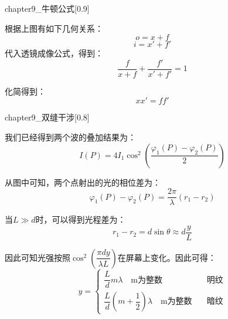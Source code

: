 \begin{prove}
  \begin{singlefigure}[牛顿公式示意图]{chapter9_牛顿公式}[0.9]
  \end{singlefigure}

  根据上图有如下几何关系：
  \[o = x + f\]
  \[i = x' + f'\]
  代入透镜成像公式，得到：
  \[\dfrac{f}{x+f} + \dfrac{f'}{x' + f'} = 1\]

  化简得到：
  \[xx' = ff'\]
\end{prove}

\begin{prove}
  \begin{singlefigure}[双缝干涉]{chapter9_双缝干涉}[0.8]
  \end{singlefigure}
  我们已经得到两个波的叠加结果为：
  \[I(P) = 4I_1\cos^2(\dfrac{\varphi_1(P) - \varphi_2(P)}{2})\]

  从图中可知，两个点射出的光的相位差为：
  \[\varphi_1(P) - \varphi_2(P) = \dfrac{2\pi}{\lambda}(r_1 - r_2)\]

  当$L \gg d$时，可以得到光程差为：
  \[r_1 - r_2 = d\sin\theta \approx d\dfrac{y}{L}\]

  因此可知光强按照$\cos^2(\dfrac{\pi d y}{\lambda L})$在屏幕上变化。因此可得：
  \[y = \begin{cases}
        \dfrac{L}{d}m\lambda \quad \text{m为整数} & \text{明纹}\\[1em]
        \dfrac{L}{d}(m+\dfrac{1}{2})\lambda \quad \text{m为整数} \quad & \text{暗纹}
  \end{cases}\]
\end{prove}


